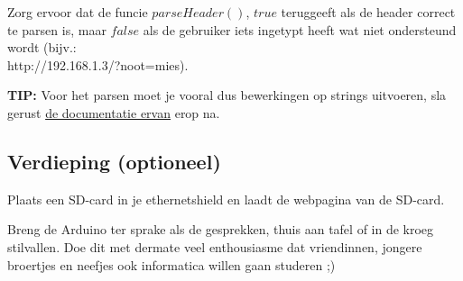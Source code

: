 \begin{exercise}
Zorg ervoor dat de funcie $parseHeader()$, $true$ teruggeeft als de header correct te parsen is, maar $false$ als de gebruiker iets ingetypt heeft wat niet ondersteund wordt (bijv.: \\ http://192.168.1.3/?noot=mies). 

\textbf{TIP: } Voor het parsen moet je vooral dus bewerkingen op strings uitvoeren, sla gerust \href{https://www.arduino.cc/reference/en/language/variables/data-types/stringobject/}{de documentatie ervan} erop na.
\end{exercise}

\subsection{Verdieping (optioneel)}
\vspace{5mm} 

\begin{exercise}
Plaats een SD-card in je ethernetshield en laadt de webpagina van de SD-card.
\end{exercise}

\begin{exercise}
Breng de Arduino ter sprake als de gesprekken, thuis aan tafel of in de kroeg stilvallen. Doe dit met dermate veel enthousiasme dat vriendinnen, jongere broertjes en neefjes ook informatica willen gaan studeren ;)
\end{exercise}





